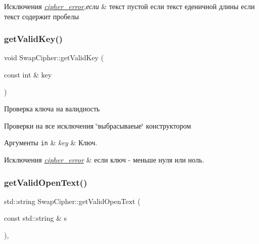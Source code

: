 \begin{DoxyExceptions}{Исключения}
{\em \hyperlink{classcipher__error}{cipher\+\_\+error},если} & текст пустой если текст еденичной длины если текст содержит пробелы \\
\hline
\end{DoxyExceptions}
\mbox{\label{classSwapCipher_a7b86880b1a197343bcf65a395c2d3d2e}} 
\subsubsection{\texorpdfstring{get\+Valid\+Key()}{getValidKey()}}
{\footnotesize\ttfamily void Swap\+Cipher\+::get\+Valid\+Key (\begin{DoxyParamCaption}\item[{const int \&}]{key }\end{DoxyParamCaption})\hspace{0.3cm}{\ttfamily [private]}}



Проверка ключа на валидность 

Проверки на все исключения \char`\"{}выбрасываеые\char`\"{} конструктором 
\begin{DoxyParams}[1]{Аргументы}
\mbox{\tt in}  & {\em key} & Ключ. \\
\hline
\end{DoxyParams}

\begin{DoxyExceptions}{Исключения}
{\em \hyperlink{classcipher__error}{cipher\+\_\+error}} & если ключ -\/ меньше нуля или ноль. \\
\hline
\end{DoxyExceptions}
\mbox{\label{classSwapCipher_aeee71718a56980b964abc32cda498a98}} 
\subsubsection{\texorpdfstring{get\+Valid\+Open\+Text()}{getValidOpenText()}}
{\footnotesize\ttfamily std\+::string Swap\+Cipher\+::get\+Valid\+Open\+Text (\begin{DoxyParamCaption}\item[{const std\+::string \&}]{s }\end{DoxyParamCaption})\hspace{0.3cm}{\ttfamily [inline]}, {\ttfamily [private]}}



